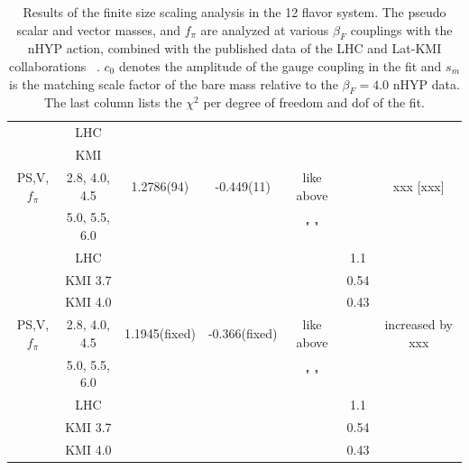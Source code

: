 \documentclass[aps,prl,twocolumn,]{revtex4}  %
\begin{document}
\begin{table}[htdp]
\begin{center}
\begin{tabular}{|c|c|c|c|c|c|c|}
	&	LHC\protect\cite{Fodor:2011tu}	&		&			&		&		&	 \\
	&	KMI\protect\cite{Aoki:2012eq} 	&		&			&		&		&	 \\
\hline	
PS,V,$f_\pi$&	2.8, 4.0, 4.5	& 	1.2786(94)	&	 -0.449(11)	&	like above	&		    &	xxx [xxx] \\
	&	5.0, 5.5, 6.0	& 	        	&	        	&	" "	&		   &		    \\
	&	LHC\protect\cite{Fodor:2011tu}	&	&			    &	&	1.1 	& 	 \\
	&	KMI 3.7\protect\cite{Aoki:2012eq}	&	&			    &		&	0.54 &	 	 \\
	&	KMI 4.0\protect\cite{Aoki:2012eq}	&	&			    &	&	0.43 &	\\
\hline
PS,V,$f_\pi$&	2.8, 4.0, 4.5	& 	1.1945(fixed)	&	 -0.366(fixed)	&	like above	&		    &	increased by xxx \\
	&	5.0, 5.5, 6.0	& 	        	&	        	&	" "	&		   &		    \\
	&	LHC\protect\cite{Fodor:2011tu}	&	&			    &	&	1.1 	& 	 \\
	&	KMI 3.7\protect\cite{Aoki:2012eq}	&	&			    &		&	0.54 &	 	 \\
	&	KMI 4.0\protect\cite{Aoki:2012eq}	&	&			    &	&	0.43 &	\\
\hline
\end{tabular}

\end{center}
 \caption{Results of the finite size scaling analysis in the 12 flavor system. The pseudo scalar and  vector masses, and $f_\pi$ are analyzed at various $\beta_F$ couplings with the nHYP action, combined with the published data of the LHC and Lat-KMI collaborations ~\protect\cite{Fodor:2011tu,Aoki:2012eq}.  
 $c_0$ denotes the amplitude of the gauge coupling in the fit and $s_m$ is the matching scale factor of the bare mass relative to the $\beta_F=4.0$ nHYP data. The last column lists the $\chi^2$ per degree of freedom and dof of the fit.  }


\label{table:results}
\end{table}%


\end{document}

